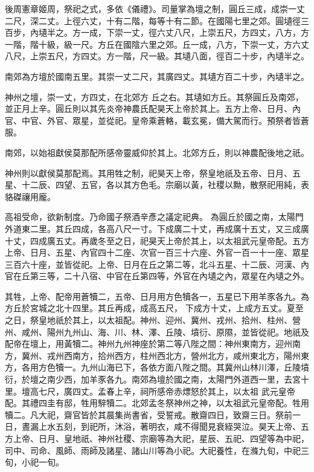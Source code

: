\begin{pinyinscope}
 後周憲章姬周，祭祀之式，多依《儀禮》。司量掌為壇之制，圓丘三成，成崇一丈二尺，深二丈。上徑六丈，十有二階，每等十有二節。在國陽七里之郊。圓壝徑三百步，內壝半之。方一成，下崇一丈，徑六丈八尺，上崇五尺，方四丈，八方，方一階，階十級，級一尺。方丘在國陰六里之郊。丘一成，八方，下崇一丈，方六丈八尺，上崇五尺，方四丈。方一階，尺一級。其壝八面，徑百二十步，內壝半之。



 南郊為方壇於國南五里。其崇一丈二尺，其廣四丈。其壝方百二十步，內壝半之。



 神州之壇，崇一丈，方四丈，在北郊方
 丘之右。其壝如方丘。其祭圓丘及南郊，並正月上辛。圓丘則以其先炎帝神農氏配昊天上帝於其上。五方上帝、日月、內官、中官、外官、眾星，並從祀。皇帝乘蒼輅，載玄冕，備大駕而行。預祭者皆蒼服。



 南郊，以始祖獻侯莫那配所感帝靈威仰於其上。北郊方丘，則以神農配後地之祇。



 神州則以獻侯莫那配焉。其用牲之制，祀昊天上帝，祭皇地祇及五帝、日月、五星、十二辰、四望、五官，各以其方色毛。宗廟以黃，社稷以黝，散祭祀用純，表貉磔禳用龐。



 高祖受命，欲新制度。乃命國子祭酒辛彥之議定祀典。
 為圓丘於國之南，太陽門外道東二里。其丘四成，各高八尺一寸。下成廣二十丈，再成廣十五丈，又三成廣十丈，四成廣五丈。再歲冬至之日，祀昊天上帝於其上，以太祖武元皇帝配。五方上帝、日月、五星、內官四十二座、次官一百三十六座、外官一百一十一座、眾星三百六十座，並皆從祀。上帝、日月在丘之第二等，北斗五星、十二辰、河漢、內官在丘第三等，二十八宿、中官在丘第四等，外官在內壝之內，眾星在內壝之外。



 其牲，上帝、配帝用蒼犢二，五帝、日月用方色犢各一，五星已下用羊豕各九。為方丘於宮城之北十四里。其丘再成，成高五尺，
 下成方十丈，上成方五丈。夏至之日，祭皇地祇於其上，以太祖配。神州、迎州、冀州、戎州、拾州、柱州、營州、咸州、陽州九州山、海、川、林、澤、丘陵、墳衍、原隰，並皆從祀。地祇及配帝在壇上，用黃犢二。神州九州神座於第二等八陛之間：神州東南方，迎州南方，冀州、戎州西南方，拾州西方，柱州西北方，營州北方，咸州東北方，陽州東方，各用方色犢一。九州山海已下，各依方面八陛之間。其冀州山林川澤，丘陵墳衍，於壇之南少西，加羊豕各九。南郊為壇於國之南，太陽門外道西一里，去宮十里。壇高七尺，廣四丈。孟春上辛，祠所感帝赤熛怒於其上，以太祖
 武元皇帝配。其禮四圭有邸，牲用騂犢二。北郊孟冬祭神州之神，以太祖武元皇帝配。牲用犢二。凡大祀，齋官皆於其晨集尚書省，受誓戒。散齋四日，致齋三日。祭前一日，晝漏上水五刻，到祀所，沐浴，著明衣，咸不得聞見衰絰哭泣。昊天上帝、五方上帝、日月、皇地祇、神州社稷、宗廟等為大祀，星辰、五祀、四望等為中祀，司中、司命、風師、雨師及諸星、諸山川等為小祀。大祀養性，在滌九旬，中祀三旬，小祀一旬。




\end{pinyinscope}
